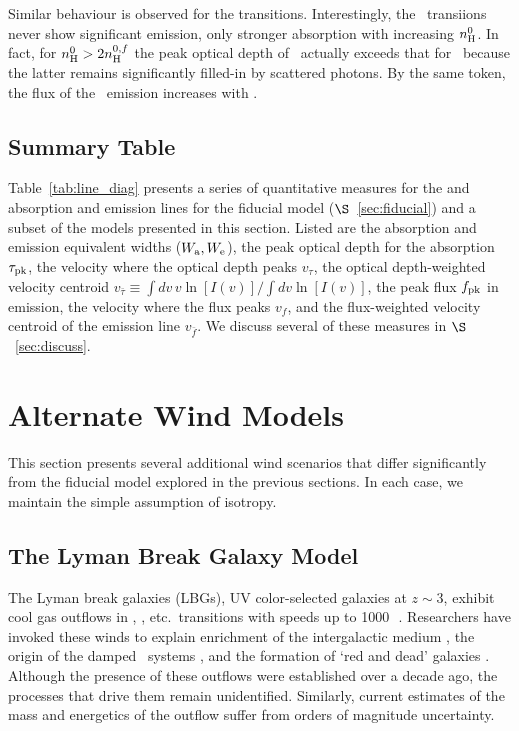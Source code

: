 \documentclass[12pt,preprint]{aastex}
\begin{document}
Similar behaviour is observed for the  transitions.
Interestingly, the \feiia\ transiions never show significant emission,
only stronger absorption with increasing $n_{\rm H}^0$.  In fact, for $n_{\rm H}^0
> 2 n_{\rm H}^{0,f}$ the peak optical depth of \feiia\ actually exceeds that
for \feiib\ because the latter remains significantly filled-in by
scattered photons.  By the same token, the flux of the \feiic\
emission increases with \nhn.

\subsection{Summary Table}

Table~\ref{tab:line_diag} presents a series of quantitative measures
for the \ion{Mg}{2} and \ion{Fe}{2} absorption and emission lines for
the fiducial model ($\S$~\ref{sec:fiducial}) and a subset of the models
presented in this section.  Listed are the absorption and emission
equivalent widths ($W_{\rm a}, W_{\rm e}$), the peak optical depth
for the absorption $\tau_{\rm pk}$, the
velocity where the optical depth peaks $v_\tau$, the optical
depth-weighted velocity centroid $v_{\bar \tau} \equiv \int dv \, v
\ln[I(v)] / \int dv \ln[I(v)]$, the peak flux $f_{\rm pk}$ in
emission, the velocity where the flux peaks $v_f$, and the
flux-weighted velocity centroid of the emission line $v_{\bar f}$.
We discuss several of these measures in $\S$~\ref{sec:discuss}.


\section{Alternate Wind Models}
\label{sec:alternate}

This section presents several additional wind scenarios that differ
significantly from the fiducial model explored in the previous
sections.  In each case, we maintain the simple assumption of
isotropy.

\subsection{The Lyman Break Galaxy Model}
\label{sec:lbg}

The Lyman break galaxies (LBGs), UV color-selected galaxies at $z \sim 3$,
exhibit cool gas outflows in \ion{Si}{2}, \ion{C}{2},
etc.\ transitions with speeds up to 1000\,\kms\
\citep[e.g.][]{lkg+97,pks+98}.
Researchers have invoked these winds to explain enrichment of
the intergalactic medium \citep[e.g.][]{ahs+01,spa+06}, the origin of the
damped \lya\ systems \citep{nbf98,schaye01a}, and the formation of
`red and dead' galaxies \citep[e.g.][]{redgal}.  Although the
presence of these outflows were established over a decade ago,
the processes that drive them remain
unidentified.  Similarly,  current estimates of the mass and energetics of the
outflow suffer from orders of magnitude uncertainty.
\end{document}
